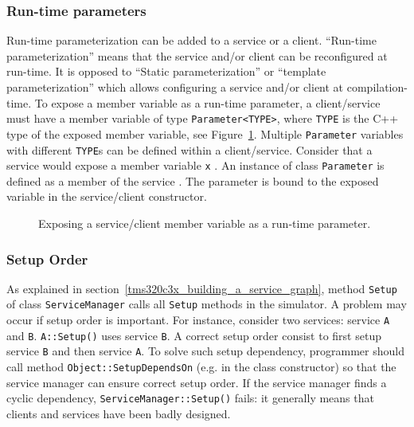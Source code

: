 \subsubsection{Run-time parameters}

Run-time parameterization can be added to a service or a client.
``Run-time parameterization'' means that the service and/or client can be reconfigured at run-time.
It is opposed to ``Static parameterization'' or ``template parameterization'' which allows configuring a service and/or client at compilation-time.
To expose a member variable as a run-time parameter, a client/service must have a member variable of type \texttt{Parameter<TYPE>}, where \texttt{TYPE} is the C++ type of the exposed member variable, see Figure~\ref{fig:tms320c3x_run_time_parameter}.
Multiple \texttt{Parameter} variables with different \texttt{TYPE}s can be defined within a client/service.
Consider that a service would expose a member variable \texttt{x} .
An instance of class \texttt{Parameter} is defined as a member of the service . 
The parameter is bound to the exposed variable  in the service/client constructor.

\begin{figure}[h]
  \begin{center}
    
    \caption{\label{fig:tms320c3x_run_time_parameter} Exposing a service/client member variable as a run-time parameter.}
  \end{center}
\end{figure}

\subsubsection{Setup Order}

As explained in section~\ref{tms320c3x_building_a_service_graph}, method \texttt{Setup} of class \texttt{ServiceManager} calls all \texttt{Setup} methods in the simulator. 
A problem may occur if setup order is important.
For instance, consider two services: service \texttt{A} and \texttt{B}. 
\texttt{A::Setup()} uses service \texttt{B}.
A correct setup order consist to first setup service \texttt{B} and then service \texttt{A}.
To solve such setup dependency, programmer should call method \texttt{Object::SetupDependsOn} (e.g. in the class constructor) so that the service manager can ensure correct setup order.
If the service manager finds a cyclic dependency, \texttt{ServiceManager::Setup()} fails: it generally means that clients and services have been badly designed.

